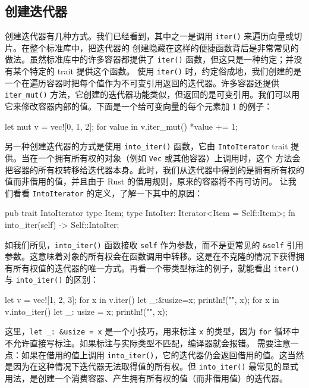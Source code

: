 \subsection{创建迭代器}
创建迭代器有几种方式。我们已经看到，其中之一是调用
\texttt{iter()} 来遍历向量或切片。在整个标准库中，把迭代器的
\label{idx:idx_a5ee54f7}
创建隐藏在这样的便捷函数背后是非常常见的做法。虽然标准库中的许多容器都提供了 \texttt{iter()} 函数，但这只是一种约定；并没有某个特定的 trait 提供这个函数。
使用 \texttt{iter()} 时，约定俗成地，我们创建的是一个在遍历容器时把每个值作为不可变引用返回的迭代器。许多容器还提供 \texttt{iter\_mut()} 方法，它创建的迭代器功能类似，但返回的是可变引用。我们可以用它来修改容器内部的值。下面是一个给可变向量的每个元素加 1 的例子：
\begin{codebox}[rust]
let mut v = vec![0, 1, 2];
for value in v.iter_mut() {
    *value += 1;
}
\end{codebox}
另一种创建迭代器的方式是使用 \texttt{into\_\allowbreak{}iter(\allowbreak{})\allowbreak{}} 函数，它由
\texttt{IntoIterator} trait 提供。当在一个拥有所有权的对象（例如 \texttt{Vec} 或其他容器）上调用时，这个
方法会把容器的所有权转移给迭代器本身。此时，我们从迭代器中得到的是拥有所有权的值而非借用的值，并且由于 Rust 的借用规则，原来的容器将不再可访问。
让我们看看 \texttt{IntoIterator} 的定义，了解一下其中的原因：
\begin{codebox}[rust]
pub trait IntoIterator {
    type Item;
    type IntoIter: Iterator<Item = Self::Item>;
    fn into_iter(self) -> Self::IntoIter;
}
\end{codebox}
\label{idx:idx_07a0f181}
如我们所见，\texttt{into\_\allowbreak{}iter(\allowbreak{})\allowbreak{}} 函数接收 \texttt{self} 作为参数，而不是更常见的 \texttt{\&self} 引用参数。这意味着对象的所有权会在函数调用中转移。这是在不克隆的情况下获得拥有所有权值的迭代器的唯一方式。再看一个带类型标注的例子，就能看出 \texttt{iter()} 与 \texttt{into\_\allowbreak{}iter(\allowbreak{})\allowbreak{}} 的区别：
\begin{codebox}[rust]
let v = vec![1, 2, 3];
for x in v.iter() {
    let _:&usize=x;
    println!("{}", x);
}
for x in v.into_iter() {
    let _: usize = x;
    println!("{}", x);
}
\end{codebox}
这里，\texttt{let \_\allowbreak{}: \&\allowbreak{}usize =\allowbreak{} x} 是一个小技巧，用来标注 \texttt{x} 的类型，因为 \texttt{for} 循环中不允许直接写标注。如果标注与实际类型不匹配，编译器就会报错。
需要注意一点：如果在借用的值上调用 \texttt{into\_\allowbreak{}iter(\allowbreak{})\allowbreak{}}，它的迭代器仍会返回借用的值。这当然是因为在这种情况下迭代器无法取得值的所有权。但 \texttt{into\_\allowbreak{}iter(\allowbreak{})\allowbreak{}} 最常见的显式用法，是创建一个消费容器、产生拥有所有权的值（而非借用值）的迭代器。
